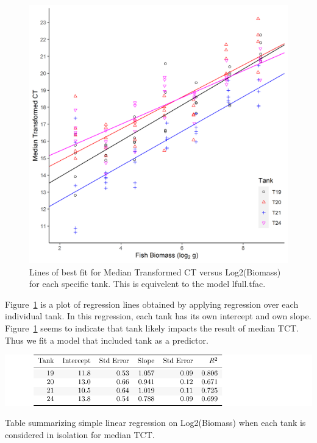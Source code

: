\begin{figure}[H]
\includegraphics{Chapter3Images/ggplotnew2.png}
\caption{ \hspace{1mm}Lines of best fit for Median Transformed CT versus Log2(Biomass) for each specific tank. This is equivelent to the model lfull.tfac.}
\label{fig:medct33}
\end{figure}

Figure~\ref{fig:medct33} is a plot of regression lines obtained by applying regression over each individual tank. In this regression, each tank has its own intercept and own slope. Figure~\ref{fig:medct33} seems to indicate that tank likely impacts the result of median TCT. Thus we fit a model that included tank as a predictor. 



\begin{table}[H]
\includegraphics{Chapter3Images/sumtable1.pdf}
\caption{\hspace{1mm}Table summarizing simple linear regression on Log2(Biomass) when each tank is considered in isolation for median TCT.}
\label{fig:lmedspecific}
\end{table}



